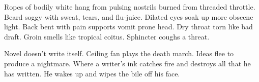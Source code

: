 \documentclass{article}
\begin{document}
\newline

Ropes of bodily white hang from pulsing nostrils burned from threaded
throttle. Beard soggy with sweat, tears, and flu-juice. Dilated eyes
soak up more obscene light. Back bent with pain supports vomit prone
head. Dry throat torn like bad draft. Groin smells like tropical coitus.
Sphincter coughs a threat.

Novel doesn't write itself. Ceiling fan plays the death march. Ideas
flee to produce a nightmare. Where a writer's ink catches fire and
destroys all that he has written. He wakes up and wipes the bile off his
face.
\end{document}
